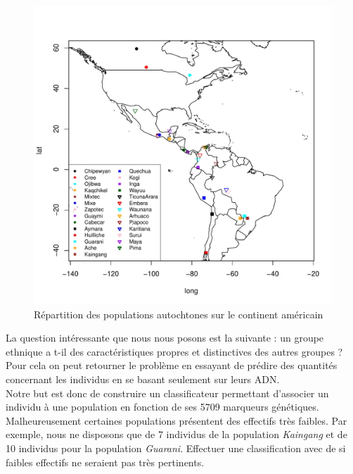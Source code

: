 \documentclass[12pt,a4paper]{article}
\begin{document}
\begin{figure}[h!]
	\begin{center}
		\includegraphics[scale=0.8]{figures/map.pdf}
		\caption{Répartition des populations autochtones sur le continent américain}
		\label{fig:map}
	\end{center}
\end{figure}
La question intéressante que nous nous posons est la suivante : un groupe
ethnique a t-il des caractéristiques propres et distinctives des autres
groupes ? Pour cela on peut retourner le problème en essayant de prédire des
quantités concernant les individus
en se basant seulement sur leurs ADN. \vspace{2mm}\\
Notre but est donc de construire un classificateur permettant d'associer un individu
à une population en fonction de ses 5709 marqueurs génétiques. Malheureusement
certaines populations présentent des effectifs très faibles. Par exemple, nous
ne disposons que de 7 individus de la population \textit{Kaingang} et de 10
individus pour la population \textit{Guarani}. Effectuer une classification
avec de si faibles effectifs ne seraient pas très pertinents.\vspace{2mm}
\end{document}
